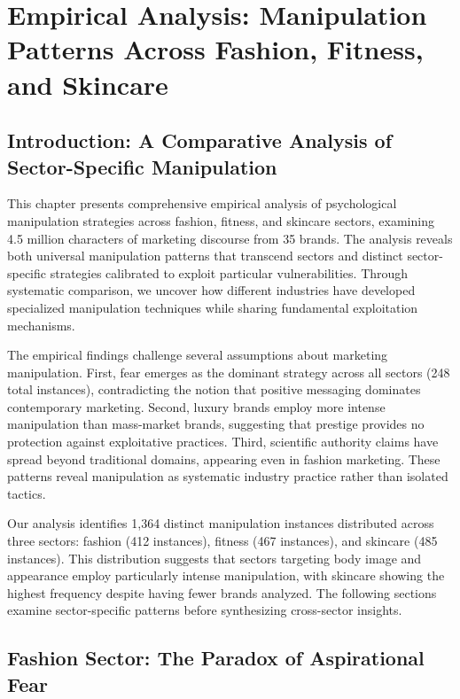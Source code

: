 
\chapter{Empirical Analysis: Manipulation Patterns Across Fashion, Fitness, and Skincare}
\label{ch:empirical}

\section{Introduction: A Comparative Analysis of Sector-Specific Manipulation}
\label{sec:empirical_intro}

This chapter presents comprehensive empirical analysis of psychological manipulation strategies across fashion, fitness, and skincare sectors, examining 4.5 million characters of marketing discourse from 35 brands. The analysis reveals both universal manipulation patterns that transcend sectors and distinct sector-specific strategies calibrated to exploit particular vulnerabilities. Through systematic comparison, we uncover how different industries have developed specialized manipulation techniques while sharing fundamental exploitation mechanisms.

The empirical findings challenge several assumptions about marketing manipulation. First, fear emerges as the dominant strategy across all sectors (248 total instances), contradicting the notion that positive messaging dominates contemporary marketing. Second, luxury brands employ more intense manipulation than mass-market brands, suggesting that prestige provides no protection against exploitative practices. Third, scientific authority claims have spread beyond traditional domains, appearing even in fashion marketing. These patterns reveal manipulation as systematic industry practice rather than isolated tactics.

Our analysis identifies 1,364 distinct manipulation instances distributed across three sectors: fashion (412 instances), fitness (467 instances), and skincare (485 instances). This distribution suggests that sectors targeting body image and appearance employ particularly intense manipulation, with skincare showing the highest frequency despite having fewer brands analyzed. The following sections examine sector-specific patterns before synthesizing cross-sector insights.

\section{Fashion Sector: The Paradox of Aspirational Fear}
\label{sec:fashion_analysis}

